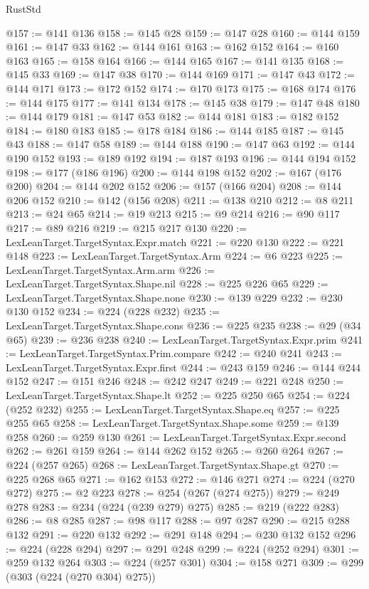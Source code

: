 \begin{lexlean}{RustStd}
\begin{coremodule}
@157 := @141 @136
@158 := @145 @28
@159 := @147 @28
@160 := @144 @159
@161 := @147 @33
@162 := @144 @161
@163 := @162 @152
@164 := @160 @163
@165 := @158 @164
@166 := @144 @165
@167 := @141 @135
@168 := @145 @33
@169 := @147 @38
@170 := @144 @169
@171 := @147 @43
@172 := @144 @171
@173 := @172 @152
@174 := @170 @173
@175 := @168 @174
@176 := @144 @175
@177 := @141 @134
@178 := @145 @38
@179 := @147 @48
@180 := @144 @179
@181 := @147 @53
@182 := @144 @181
@183 := @182 @152
@184 := @180 @183
@185 := @178 @184
@186 := @144 @185
@187 := @145 @43
@188 := @147 @58
@189 := @144 @188
@190 := @147 @63
@192 := @144 @190 @152
@193 := @189 @192
@194 := @187 @193
@196 := @144 @194 @152
@198 := @177 (@186 @196)
@200 := @144 @198 @152
@202 := @167 (@176 @200)
@204 := @144 @202 @152
@206 := @157 (@166 @204)
@208 := @144 @206 @152
@210 := @142 (@156 @208)
@211 := @138 @210
@212 := @8 @211
@213 := @24 @65
@214 := @19 @213
@215 := @9 @214
@216 := @90 @117
@217 := @89 @216
@219 := @215 @217 @130
@220 := LexLeanTarget.TargetSyntax.Expr.match
@221 := @220 @130
@222 := @221 @148
@223 := LexLeanTarget.TargetSyntax.Arm
@224 := @6 @223
@225 := LexLeanTarget.TargetSyntax.Arm.arm
@226 := LexLeanTarget.TargetSyntax.Shape.nil
@228 := @225 @226 @65
@229 := LexLeanTarget.TargetSyntax.Shape.none
@230 := @139 @229
@232 := @230 @130 @152
@234 := @224 (@228 @232)
@235 := LexLeanTarget.TargetSyntax.Shape.cons
@236 := @225 @235
@238 := @29 (@34 @65)
@239 := @236 @238
@240 := LexLeanTarget.TargetSyntax.Expr.prim
@241 := LexLeanTarget.TargetSyntax.Prim.compare
@242 := @240 @241
@243 := LexLeanTarget.TargetSyntax.Expr.first
@244 := @243 @159
@246 := @144 @244 @152
@247 := @151 @246
@248 := @242 @247
@249 := @221 @248
@250 := LexLeanTarget.TargetSyntax.Shape.lt
@252 := @225 @250 @65
@254 := @224 (@252 @232)
@255 := LexLeanTarget.TargetSyntax.Shape.eq
@257 := @225 @255 @65
@258 := LexLeanTarget.TargetSyntax.Shape.some
@259 := @139 @258
@260 := @259 @130
@261 := LexLeanTarget.TargetSyntax.Expr.second
@262 := @261 @159
@264 := @144 @262 @152
@265 := @260 @264
@267 := @224 (@257 @265)
@268 := LexLeanTarget.TargetSyntax.Shape.gt
@270 := @225 @268 @65
@271 := @162 @153
@272 := @146 @271
@274 := @224 (@270 @272)
@275 := @2 @223
@278 := @254 (@267 (@274 @275))
@279 := @249 @278
@283 := @234 (@224 (@239 @279) @275)
@285 := @219 (@222 @283)
@286 := @8 @285
@287 := @98 @117
@288 := @97 @287
@290 := @215 @288 @132
@291 := @220 @132
@292 := @291 @148
@294 := @230 @132 @152
@296 := @224 (@228 @294)
@297 := @291 @248
@299 := @224 (@252 @294)
@301 := @259 @132 @264
@303 := @224 (@257 @301)
@304 := @158 @271
@309 := @299 (@303 (@224 (@270 @304) @275))

\end{coremodule}
\end{lexlean}

